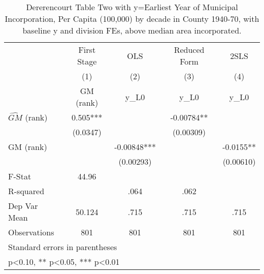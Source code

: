 \begin{table}[htbp]\centering
\def\sym#1{\ifmmode^{#1}\else\(^{#1}\)\fi}
\caption{Dererencourt Table Two with y=Earliest Year of Municipal Incorporation, Per Capita (100,000) by decade in County 1940-70, with baseline y and division FEs, above median area incorporated.}
\begin{tabular}{l*{4}{c}}
\toprule
                    & First Stage   &         OLS   &Reduced Form   &        2SLS   \\
                    &\multicolumn{1}{c}{(1)}&\multicolumn{1}{c}{(2)}&\multicolumn{1}{c}{(3)}&\multicolumn{1}{c}{(4)}\\
                    &\multicolumn{1}{c}{GM  (rank)}&\multicolumn{1}{c}{y\_L0}&\multicolumn{1}{c}{y\_L0}&\multicolumn{1}{c}{y\_L0}\\
\midrule
$\hat{GM}$ (rank)   &       0.505***&               &    -0.00784** &               \\
                    &    (0.0347)   &               &   (0.00309)   &               \\
\addlinespace
GM  (rank)          &               &    -0.00848***&               &     -0.0155** \\
                    &               &   (0.00293)   &               &   (0.00610)   \\
\midrule
F-Stat              &       44.96   &               &               &               \\
R-squared           &               &        .064   &        .062   &               \\
Dep Var Mean        &      50.124   &        .715   &        .715   &        .715   \\
Observations        &         801   &         801   &         801   &         801   \\
\bottomrule
\multicolumn{5}{l}{\footnotesize Standard errors in parentheses}\\
\multicolumn{5}{l}{\footnotesize * p<0.10, ** p<0.05, *** p<0.01}\\
\end{tabular}
\end{table}
